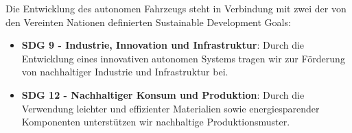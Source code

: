 \documentclass[../../main.tex]{subfiles} %
\begin{document}
Die Entwicklung des autonomen Fahrzeugs steht in Verbindung mit zwei
der von den Vereinten Nationen definierten Sustainable Development Goals:

\begin{itemize}
  \item \textbf{SDG 9 - Industrie, Innovation und Infrastruktur}:
    Durch die Entwicklung eines innovativen autonomen Systems tragen
    wir zur Förderung von nachhaltiger Industrie und Infrastruktur bei.
  \item \textbf{SDG 12 - Nachhaltiger Konsum und Produktion}: Durch
    die Verwendung leichter und effizienter Materialien sowie
    energiesparender Komponenten unterstützen wir nachhaltige
    Produktionsmuster.
\end{itemize}
\end{document}
